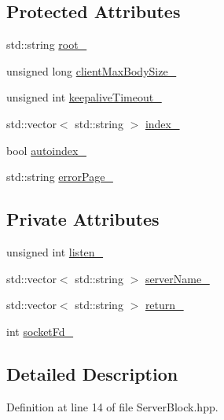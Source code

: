 \subsection*{Protected Attributes}
\begin{DoxyCompactItemize}
\item 
std\+::string \hyperlink{classft_1_1_base_directives_abb1eaf0bba10b90172d6152e69457dc7}{root\+\_\+}
\item 
unsigned long \hyperlink{classft_1_1_base_directives_ad65c2594d2a90ca065d410dfd4066a19}{client\+Max\+Body\+Size\+\_\+}
\item 
unsigned int \hyperlink{classft_1_1_base_directives_aa1f5f394b428d0d18765a9b9e14e648f}{keepalive\+Timeout\+\_\+}
\item 
std\+::vector$<$ std\+::string $>$ \hyperlink{classft_1_1_base_directives_a6ba30626837f300201cd32c35d50aa49}{index\+\_\+}
\item 
bool \hyperlink{classft_1_1_base_directives_a4ebffbe32f50a462afa139c6f03c1a4f}{autoindex\+\_\+}
\item 
std\+::string \hyperlink{classft_1_1_base_directives_a5c0d388109f086503961de84fe3fce90}{error\+Page\+\_\+}
\end{DoxyCompactItemize}
\subsection*{Private Attributes}
\begin{DoxyCompactItemize}
\item 
unsigned int \hyperlink{classft_1_1_server_block_aa3d35e32d01734ff75f940faaee932f5}{listen\+\_\+}
\item 
std\+::vector$<$ std\+::string $>$ \hyperlink{classft_1_1_server_block_adc26ae834350b4c964d4198e7a431e90}{server\+Name\+\_\+}
\item 
std\+::vector$<$ std\+::string $>$ \hyperlink{classft_1_1_server_block_abab721f365aff66f8a1289de21c8f01f}{return\+\_\+}
\item 
int \hyperlink{classft_1_1_server_block_ab9901cea4f6daccf6b8f8a3c6f438e9c}{socket\+Fd\+\_\+}
\end{DoxyCompactItemize}


\subsection{Detailed Description}


Definition at line 14 of file Server\+Block.\+hpp.



